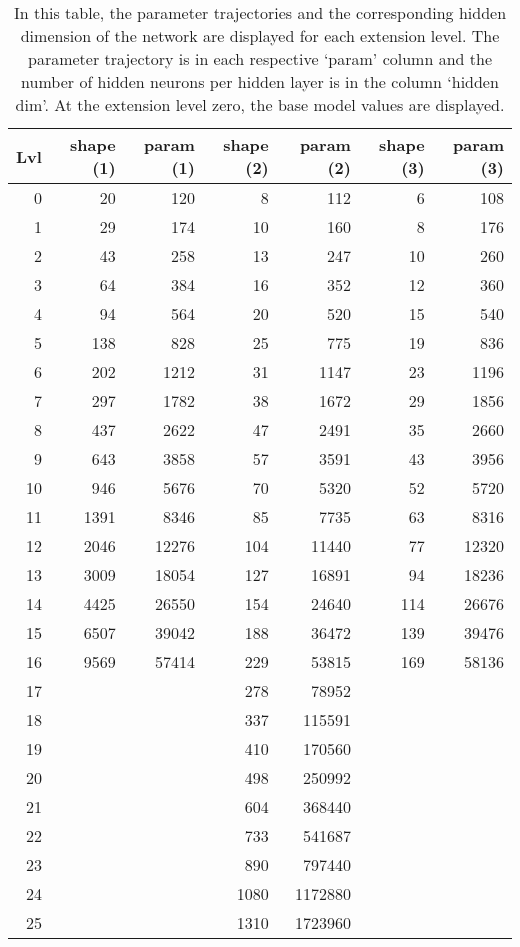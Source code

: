 \begin{table}[ht]
    {
    \sffamily
    \caption{
    In this table, the parameter trajectories and the corresponding hidden dimension of the network are displayed for each extension level. 
    The parameter trajectory is in each respective `param' column and the number of hidden neurons per hidden layer is in the column `hidden dim'.
    At the extension level zero, the base model values are displayed.
    }\label{tab:trajectory}
    \begin{tabular}{rrrrrrr}
    \toprule
    Lvl & shape (1) & param (1) & shape (2) & param (2) & shape (3) & param (3) \\
    \midrule
    0 & 20 & 120 & 8 & 112 & 6 & 108 \\
    1 & 29 & 174 & 10 & 160 & 8 & 176 \\
    2 & 43 & 258 & 13 & 247 & 10 & 260 \\
    3 & 64 & 384 & 16 & 352 & 12 & 360 \\
    4 & 94 & 564 & 20 & 520 & 15 & 540 \\
    5 & 138 & 828 & 25 & 775 & 19 & 836 \\
    6 & 202 & 1212 & 31 & 1147 & 23 & 1196 \\
    7 & 297 & 1782 & 38 & 1672 & 29 & 1856 \\
    8 & 437 & 2622 & 47 & 2491 & 35 & 2660 \\
    9 & 643 & 3858 & 57 & 3591 & 43 & 3956 \\
    10 & 946 & 5676 & 70 & 5320 & 52 & 5720 \\
    11 & 1391 & 8346 & 85 & 7735 & 63 & 8316 \\
    12 & 2046 & 12276 & 104 & 11440 & 77 & 12320 \\
    13 & 3009 & 18054 & 127 & 16891 & 94 & 18236 \\
    14 & 4425 & 26550 & 154 & 24640 & 114 & 26676 \\
    15 & 6507 & 39042 & 188 & 36472 & 139 & 39476 \\
    16 & 9569 & 57414 & 229 & 53815 & 169 & 58136 \\
    17 &   &   & 278 & 78952 &   &   \\
    18 &   &   & 337 & 115591 &   &   \\
    19 &   &   & 410 & 170560 &   &   \\
    20 &   &   & 498 & 250992 &   &   \\
    21 &   &   & 604 & 368440 &   &   \\
    22 &   &   & 733 & 541687 &   &   \\
    23 &   &   & 890 & 797440 &   &   \\
    24 &   &   & 1080 & 1172880 &   &   \\
    25 &   &   & 1310 & 1723960 &   &   \\
    \bottomrule
    \end{tabular}
    }
\end{table}

